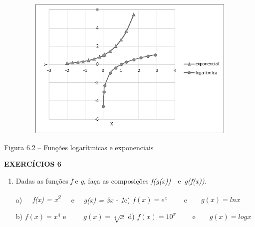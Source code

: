 \documentclass[12pt]{article}
\begin{document}
\begin{enumerate}[label*={\fontsize{14pt}{14pt}\selectfont \textbf{\arabic*.}}]

\begin{figure}[H]
	\begin{Center}
		\includegraphics[width=4.77in,height=2.7in]{./media/image4.png}
	\end{Center}
\end{figure}



\par

Figura 6.2 – Funções logarítmicas e exponenciais\par


\vspace{\baselineskip}

\vspace{\baselineskip}
{\fontsize{14pt}{16.8pt}\selectfont \textbf{EXERCÍCIOS 6}\par}\par


\vspace{\baselineskip}
\begin{enumerate}
	\item Dadas as funções \textit{f} e \textit{g}, faça as composições \textit{f(g(x))}\ \  e\  \textit{g(f(x)).}\par

 \par

a)\textit{\ \ \  f(x) = x\textsuperscript{2}\ \ \  }e \textit{\ \  g(x) = 3x - 1\tab \tab \tab }c) \textit{  \( f \left( x \right) =e^{x} \) \tab }\ \ \ \ e\ \ \ \    \( g \left( x \right) =lnx \) \par

b) \tab  \( f \left( x \right) =x^{4} \) \tab e\ \ \ \ \   \( g \left( x \right) =\sqrt[4]{x} \) \tab \tab d)  \(  f \left( x \right) =10^{x} \) \ \ \ \ e\ \ \ \    \(  g \left( x \right) =logx  \) \par



\end{enumerate}
\end{enumerate}
\end{document}
